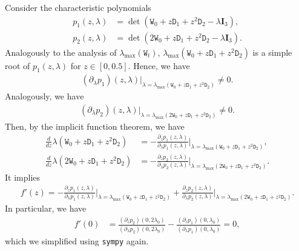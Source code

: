 \documentclass[11pt]{article}
\newcommand{\bI}{\bm{I}}
\newcommand{\<}{\langle}
\renewcommand{\>}{\rangle}
\newcommand{\ttW}{\mathtt{W}}
\newcommand{\ttD}{\mathtt{D}}
\theoremstyle{plain}
\theoremstyle{definition}
\theoremstyle{remark}
\begin{document}
{   Consider the characteristic polynomials
   \begin{align*}
        p_1(z, \lambda) & = \det (\ttW_0 + z \ttD_1 + z^2 \ttD_2 - \lambda \bI_3), \\
        p_2(z, \lambda) & = \det( 2 \ttW_0 + z \ttD_1 + z^2 \ttD_2 - \lambda \bI_3).
   \end{align*} 
   Analogously to the analysis of $\lambda_{\max}(\ttW_t)$, $\lambda_{\max}(\ttW_0 + z \ttD_1 + z^2 \ttD_2)$ is a simple root of $p_1(z, \lambda)$ for $z \in [0, 0.5]$. Hence, we have
   \begin{align*}
    (\partial_{\lambda} p_1)(z, \lambda) \bigg |_{\lambda = \lambda_{\max}(\ttW_0 + z \ttD_1 + z^2 \ttD_2)} \neq 0.
   \end{align*}
   Analogously, we have
   \begin{align*}
        (\partial_{\lambda} p_2)(z, \lambda) \bigg |_{\lambda = \lambda_{\max}(2\ttW_0 + z \ttD_1 + z^2 \ttD_2)} \neq 0.
   \end{align*}
   Then, by the implicit function theorem, we have
   \begin{align}
        \frac{d}{dz} \lambda(\ttW_0 + z \ttD_1 + z^2 \ttD_2)&  = - \frac{\partial_z p_1(z, \lambda)}{\partial_{\lambda} p_1(z, \lambda)} \bigg |_{\lambda = \lambda_{\max}(\ttW_0 + z \ttD_1 + z^2 \ttD_2)}, \label{eq: first lambda derivative}\\ 
        \frac{d}{dz} \lambda(2\ttW_0 + z \ttD_1 + z^2 \ttD_2)&  = - \frac{\partial_z p_2(z, \lambda)}{\partial_{\lambda} p_2(z, \lambda)} \bigg |_{\lambda = \lambda_{\max}(2\ttW_0 + z \ttD_1 + z^2 \ttD_2)}. \label{eq: second lambda derivative}
   \end{align}
   It implies
   \begin{align*}
        f'(z) = - \frac{\partial_z p_1(z, \lambda)}{\partial_{\lambda} p_1(z, \lambda)} \bigg |_{\lambda = \lambda_{\max}(\ttW_0 + z \ttD_1 + z^2 \ttD_2)} + \frac{\partial_z p_2(z, \lambda)}{\partial_{\lambda} p_2(z, \lambda)} \bigg |_{\lambda = \lambda_{\max}(2 \ttW_0 + z \ttD_1 + z^2 \ttD_2)}.
   \end{align*}
   In particular, we have
   \begin{align*}
        f'(0) & = \frac{(\partial_z p_2)(0, 2\lambda_0)}{(\partial_{\lambda}p_2)(0, 2\lambda_0)} - \frac{(\partial_z p_1)(0, \lambda_0)}{(\partial_{\lambda}p_1)(0, \lambda_0)} = 0,
   \end{align*}
   which we simplified using \texttt{sympy} again. 

}
\end{document}
